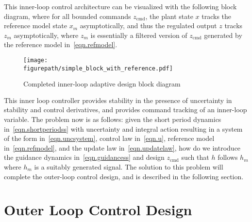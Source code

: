 \documentclass[]{../sty/aiaa-tc}
\newcommand{\figurepath}{../fig}
\theoremstyle{examplestyle}
\begin{document}
  This inner-loop control architecture can be visualized with the following block diagram, where for all bounded commands $z_{\text{cmd}}$, the plant state $x$ tracks the reference model state $x_{m}$ asymptotically, and thus the regulated output $z$ tracks $z_{m}$ asymptotically, where $z_{m}$ is essentially a filtered version of $z_{\text{cmd}}$ generated by the reference model in\ \eqref{eqn.refmodel}.

  \begin{figure}[H]
    \begin{center}
      \texttt{[image: \\figurepath/simple\_block\_with\_reference.pdf]}
      \vspace{-0.1in}
      \caption{Completed inner-loop adaptive design block diagram}
    \end{center}
  \end{figure}

  This inner loop controller provides stability in the presence of uncertainty in stability and control derivatives, and provides command tracking of an inner-loop variable.
  The problem now is as follows: given the short period dynamics in\ \eqref{eqn.shortperiodss} with uncertainty and integral action resulting in a system of the form in\ \eqref{eqn.uncsystem}, control law in\ \eqref{eqn.u}, reference model in\ \eqref{eqn.refmodel}, and the update law in\ \eqref{eqn.updatelaw}, how do we introduce the guidance dynamics in\ \eqref{eqn.guidancess} and design $z_{\text{cmd}}$ such that $h$ follows $h_{m}$ where $h_{m}$ is a suitably generated signal.
  The solution to this problem will complete the outer-loop control design, and is described in the following section.

  \section{Outer Loop Control Design}\label{sec.outerloop}
\end{document}
